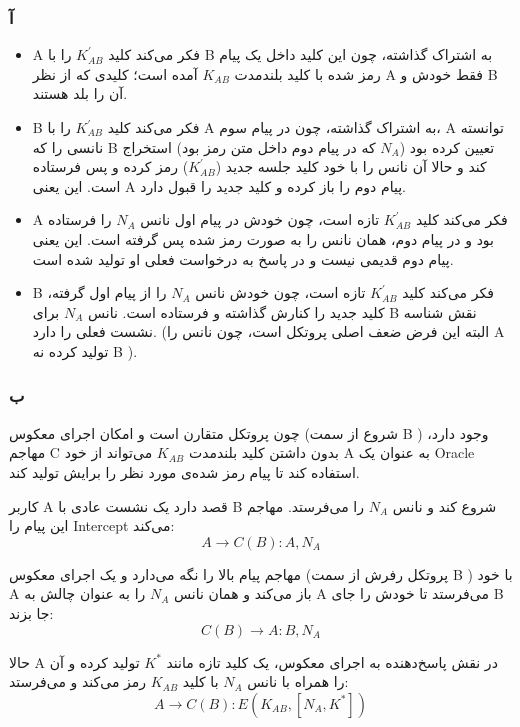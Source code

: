 \subsubsection*{آ}
\begin{itemize}
    \item A فکر می‌کند کلید $K_{AB}^{\prime}$ را با B به اشتراک گذاشته، چون این کلید داخل یک پیام رمز شده با کلید بلندمدت $K_{AB}$ آمده است؛ کلیدی که از نظر A فقط خودش و B آن را بلد هستند.
    \item B فکر می‌کند کلید $K_{AB}^{\prime}$ را با A به اشتراک گذاشته، چون در پیام سوم، A توانسته نانسی را که B تعیین کرده بود ($N_A$ که در پیام دوم داخل متن رمز بود) استخراج کند و حالا آن نانس را با خود کلید جلسه جدید ($K_{AB}^{\prime}$) رمز کرده و پس فرستاده است. این یعنی A پیام دوم را باز کرده و کلید جدید را قبول دارد.
    \item A فکر می‌کند کلید $K_{AB}^{\prime}$ تازه است، چون خودش در پیام اول نانس $N_A$ را فرستاده بود و در پیام دوم، همان نانس را به صورت رمز شده پس گرفته است. این یعنی پیام دوم قدیمی نیست و در پاسخ به درخواست فعلی او تولید شده است.
    \item B فکر می‌کند کلید $K_{AB}^{\prime}$ تازه است، چون خودش نانس $N_A$ را از پیام اول گرفته، کلید جدید را کنارش گذاشته و فرستاده است. نانس $N_A$ برای B نقش شناسه نشست فعلی را دارد. (البته این فرض ضعف اصلی پروتکل است، چون نانس را A تولید کرده نه B ).
\end{itemize}

\medskip
\subsubsection*{ب}

چون پروتکل متقارن است و امکان اجرای معکوس (شروع از سمت B ) وجود دارد، مهاجم C بدون داشتن کلید بلندمدت $K_{AB}$ می‌تواند از خود A به عنوان یک Oracle استفاده کند تا پیام رمز شده‌ی مورد نظر را برایش تولید کند. 

 کاربر A قصد دارد یک نشست عادی با B شروع کند و نانس $N_A$ را می‌فرستد. مهاجم این پیام را Intercept می‌کند:
    $$ A \rightarrow C(B): A, N_A$$
    
 مهاجم پیام بالا را نگه می‌دارد و یک اجرای معکوس (پروتکل رفرش از سمت B ) با خود A باز می‌کند و همان نانس $N_A$ را به عنوان چالش به A می‌فرستد تا خودش را جای B جا بزند:
    $$C(B) \rightarrow A: B, N_A$$
    
 حالا A در نقش پاسخ‌دهنده به اجرای معکوس، یک کلید تازه مانند $K^*$ تولید کرده و آن را همراه با نانس $N_A$ با کلید $K_{AB}$ رمز می‌کند و می‌فرستد:
    $$ A \rightarrow C(B): E(K_{AB}, [N_A, K^*])$$
    

